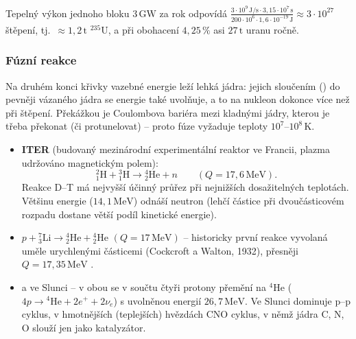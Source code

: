 \begin{priklad}
Tepelný výkon jednoho bloku \(3\,\mathrm{GW}\) za rok odpovídá
\(\frac{3\cdot10^9\,\mathrm{J/s}\cdot3{,}15\cdot10^7\,\mathrm{s}}{200\cdot10^6\cdot1{,}6\cdot10^{-19}\,\mathrm{J}}\approx3\cdot10^{27}\) štěpení,
tj.\ \(\approx1{,}2\,\mathrm{t}\) \({}^{235}\mathrm{U}\), a při obohacení \(4{,}25\,\%\) asi \(27\,\mathrm{t}\) uranu ročně.
\end{priklad}

\subsubsection{Fúzní reakce}

Na druhém konci křivky vazebné energie leží lehká jádra: jejich sloučením () do pevněji vázaného jádra se energie
také uvolňuje, a to na nukleon dokonce více než při štěpení. Překážkou je Coulombova bariéra mezi kladnými jádry, kterou je třeba
překonat (či protunelovat) -- proto fúze vyžaduje teploty \(10^7\)--\(10^8\,\mathrm{K}\).
\begin{itemize}
  \item {} \textbf{ITER} (budovaný mezinárodní experimentální reaktor ve Francii, plazma udržováno magnetickým polem):
  \[
    {}^2_1\mathrm{H} + {}^3_1\mathrm{H} \to {}^4_2\mathrm{He} + n \qquad (Q = 17{,}6\,\mathrm{MeV}).
  \]
  Reakce D--T má nejvyšší účinný průřez při nejnižších dosažitelných teplotách. Většinu energie (\(14{,}1\,\mathrm{MeV}\)) odnáší
  neutron (lehčí částice při dvoučásticovém rozpadu dostane větší podíl kinetické energie).
  \item \(p + {}^7_3\mathrm{Li} \to {}^4_2\mathrm{He} + {}^4_2\mathrm{He}\) \quad \((Q = 17\,\mathrm{MeV})\) -- historicky první reakce
  vyvolaná uměle urychlenými částicemi (Cockcroft a Walton, 1932), přesněji \(Q=17{,}35\,\mathrm{MeV}\)
  .
  \item {} a  ve Slunci -- v obou se v součtu čtyři protony přemění na \({}^4\mathrm{He}\)
  (\(4p\to{}^4\mathrm{He}+2e^++2\nu_e\)) s uvolněnou energií \(26{,}7\,\mathrm{MeV}\). Ve Slunci dominuje p--p cyklus, v hmotnějších (teplejších)
  hvězdách CNO cyklus, v němž jádra C, N, O slouží jen jako katalyzátor.
\end{itemize}
